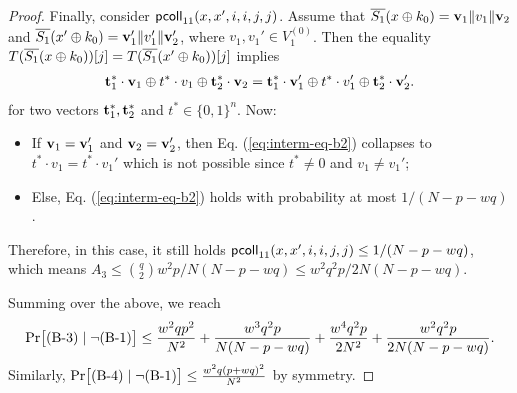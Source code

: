 \begin{proof}
Finally, consider $\mathsf{pcoll}_{11}(x,x',i,i,j,j)$. Assume that $\overline{S_1}(x\oplus k_0)=\mathbf{v}_1\|v_1\|\mathbf{v}_2$ and
$\overline{S_1}(x'\oplus k_0)=\mathbf{v}_1'\|v_1'\|\mathbf{v}_2'$, where $v_1,v_1'\in V_1^{(0)}$. Then the equality $T(\overline{S_1}(x\oplus k_0))[j]=T(\overline{S_1}(x'\oplus k_0))[j]$ implies
%
\begin{align}
\mathbf{t}_1^*\cdot\mathbf{v}_1\oplus t^*\cdot v_1\oplus\mathbf{t}_2^*\cdot\mathbf{v}_2=\mathbf{t}_1^*\cdot\mathbf{v}_1'\oplus t^*\cdot v_1'\oplus\mathbf{t}_2^*\cdot\mathbf{v}_2'.
\label{eq:interm-eq-b2}
\end{align}
%
%
for two vectors $\mathbf{t}_1^*,\mathbf{t}_2^*$ and $t^*\in\{0,1\}^n$. Now:
\begin{itemize}
	\item If $\mathbf{v}_1=\mathbf{v}_1'$ and $\mathbf{v}_2=\mathbf{v}_2'$, then Eq. (\ref{eq:interm-eq-b2}) collapses to $t^*\cdot v_1=t^*\cdot v_1'$ which is not possible since $t^*\neq 0$ and $v_1\neq v_1'$;
	\item Else, Eq. (\ref{eq:interm-eq-b2}) holds with probability at most $1/(N-p-wq)$.
\end{itemize}
Therefore, in this case, it still holds $\mathsf{pcoll}_{11}(x,x',i,i,j,j)\leq1/(N-p-wq)$, which means $A_3\leq{q\choose2}w^2p/N(N-p-wq)\leq w^2q^2p/2N(N-p-wq)$.


Summing over the above, we reach
%
$${\Pr}\big[\text{(B-3)}\mid\neg\text{(B-1)}\big]\leq\frac{w^2qp^2}{N^2}
+
\frac{w^3q^2p}{N(N-p-wq)}
+
\frac{w^4q^2p}{2N^2}
+
\frac{w^2q^2p}{2N(N-p-wq)}.$$
%
Similarly, ${\Pr}\big[\text{(B-4)}\mid\neg\text{(B-1)}\big] \leq \frac{w^{2} q \left(p+w q\right)^{2}}{N^{2}}$ by symmetry.





\end{proof}
